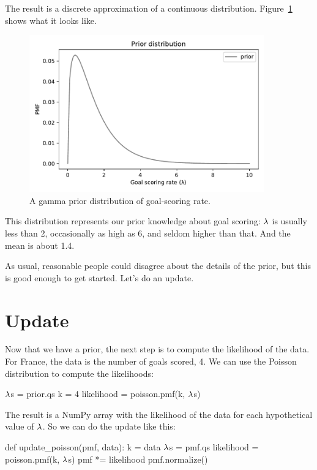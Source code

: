 \documentclass[12pt]{book}
\theoremstyle{exercise}
\begin{document}
The result is a discrete approximation of a continuous distribution.
Figure~\ref{fig07-02} shows what it looks like.

\begin{figure}
\centerline{\includegraphics[width=4in]{figs/fig07-02.pdf}}
\caption{A gamma prior distribution of goal-scoring rate.}
\label{fig07-02}
\end{figure}

This distribution represents our prior knowledge about goal scoring: $\mathtt{\lambda}$ is usually less than 2, occasionally as high as 6, and seldom higher than that.  And the mean is about 1.4.

As usual, reasonable people could disagree about the details of the prior, but this is good enough to get started.  
Let's do an update.



\section{Update}

Now that we have a prior, the next step is to compute the likelihood of the data.
For France, the data is the number of goals scored, 4.
We can use the Poisson distribution to compute the likelihoods:

\begin{code}
$\mathtt{\lambda}$s = prior.qs
k = 4
likelihood = poisson.pmf(k, $\mathtt{\lambda}$s)
\end{code}

The result is a NumPy array with the likelihood of the data for each hypothetical value of $\mathtt{\lambda}$.
So we can do the update like this:

\begin{code}
def update_poisson(pmf, data):
    k = data
    $\mathtt{\lambda}$s = pmf.qs
    likelihood = poisson.pmf(k, $\mathtt{\lambda}$s)
    pmf *= likelihood
    pmf.normalize()
\end{code}  
\end{document}
